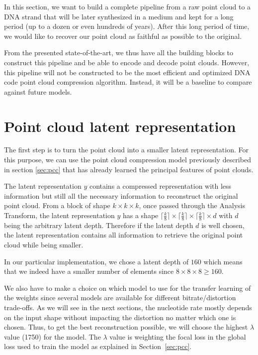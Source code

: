 
In this section, we want to build a complete pipeline from a raw point cloud to a DNA strand that will be later synthesized in a medium and kept for a long period (up to a dozen or even hundreds of years). After this long period of time, we would like to recover our point cloud as faithful as possible to the original. 

From the presented state-of-the-art, we thus have all the building blocks to construct this pipeline and be able to encode and decode point clouds. However, this pipeline will not be constructed to be the most efficient and optimized DNA code point cloud compression algorithm. Instead, it will be a baseline to compare against future models. 



\section{Point cloud latent representation}

The first step is to turn the point cloud into a smaller latent representation. For this purpose, we can use the point cloud compression model previously described in section \ref{sec:pcc} that has already learned the principal features of point clouds. 

The latent representation $y$ contains a compressed representation with less information but still all the necessary information to reconstruct the original point cloud. From a block of shape $k \times k \times k$, once passed through the Analysis Transform, the latent representation $y$ has a shape $\lceil\frac{k}{8}\rceil \times \lceil\frac{k}{8}\rceil \times \lceil\frac{k}{8}\rceil \times d$ with $d$ being the arbitrary latent depth. Therefore if the latent depth $d$ is well chosen, the latent representation contains all information to retrieve the original point cloud while being smaller.

In our particular implementation, we chose a latent depth of $160$ which means that we indeed have a smaller number of elements since $8 \times 8 \times 8 \geq 160$. 

We also have to make a choice on which model to use for the transfer learning of the weights since several models are available for different bitrate/distortion trade-offs. As we will see in the next sections, the nucleotide rate mostly depends on the input shape without impacting the distortion no matter which one is chosen. Thus, to get the best reconstruction possible, we will choose the highest $\lambda$ value (1750) for the model. The $\lambda$ value is weighting the focal loss in the global loss used to train the model as explained in Section~\ref{sec:pcc}.

